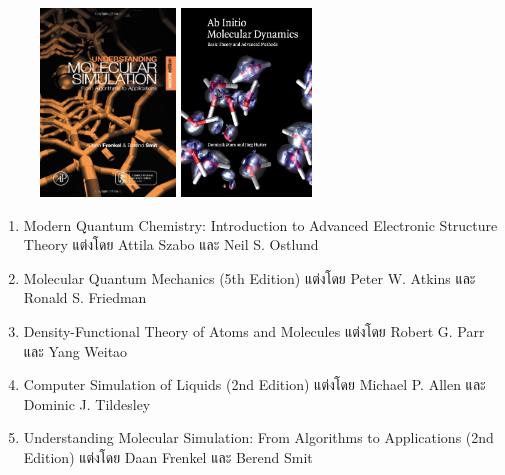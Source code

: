{\begin{figure}[H]
\begin{center}
        \hspace{0.5em}
        \includegraphics[height=5cm]{fig/understand-mol-sim.jpg}
        \hspace{0.5em}
        \includegraphics[height=5cm]{fig/aimd.jpeg}
    \end{center}
\end{figure}

\begin{enumerate}[topsep=0pt,noitemsep]
    \setlength\itemsep{0.5em}
    \item Modern Quantum Chemistry: Introduction to Advanced Electronic Structure Theory
    แต่งโดย Attila Szabo และ Neil S. Ostlund\autocite{szabo1996}

    \item Molecular Quantum Mechanics (5th Edition)
    แต่งโดย Peter W. Atkins และ Ronald S. Friedman\autocite{atkins2010}

    \item Density-Functional Theory of Atoms and Molecules 
    แต่งโดย Robert G. Parr และ Yang Weitao\autocite{parr1994}

    \item Computer Simulation of Liquids (2nd Edition)
    แต่งโดย Michael P. Allen และ Dominic J. Tildesley\autocite{allen2017}
    
    \item Understanding Molecular Simulation: From Algorithms to Applications (2nd Edition)
    แต่งโดย Daan Frenkel และ Berend Smit\autocite{frenkel2001}


\end{enumerate}}
